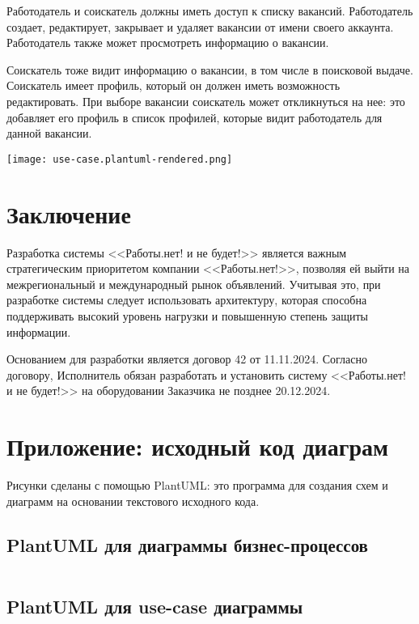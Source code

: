 \documentclass[a4page]{article}
\begin{document}
Работодатель и соискатель должны иметь доступ к списку вакансий.
Работодатель создает, редактирует, закрывает и удаляет вакансии от имени
своего аккаунта.
Работодатель также может просмотреть информацию о вакансии.

Соискатель тоже видит информацию о вакансии, в том числе в поисковой выдаче.
Соискатель имеет профиль, который он должен иметь возможность редактировать.
При выборе вакансии соискатель может откликнуться на нее:
это добавляет его профиль в список профилей, которые видит работодатель для данной вакансии.

\texttt{[image: use-case.plantuml-rendered.png]}

\newpage
\section{Заключение}

Разработка системы <<Работы.нет! и не будет!>> является важным стратегическим приоритетом компании <<Работы.нет!>>,
позволяя ей выйти на межрегиональный и международный рынок объявлений.
Учитывая это, при разработке системы следует использовать архитектуру, которая способна поддерживать высокий уровень нагрузки
и повышенную степень защиты информации.

Основанием для разработки является договор 42 от 11.11.2024.
Согласно договору, Исполнитель обязан разработать и установить систему <<Работы.нет! и не будет!>> на оборудовании Заказчика не позднее 20.12.2024.

\newpage
\section{Приложение: исходный код диаграм}

Рисунки сделаны с помощью PlantUML: это программа для создания схем и диаграмм
на основании текстового исходного кода.

\subsection{PlantUML для диаграммы бизнес-процессов}

\inputminted[fontsize=\footnotesize]{text}{diagrams/bus-proc.plantuml}

\subsection{PlantUML для use-case диаграммы}

\inputminted[fontsize=\footnotesize]{text}{diagrams/use-case.plantuml}
\end{document}
